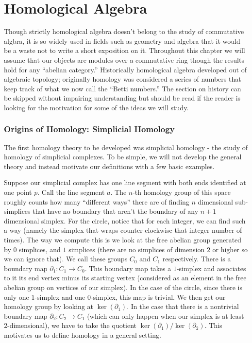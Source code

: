 \usepackage{amscd}
\chapter{Homological Algebra} 

Though strictly homological algebra doesn't
belong to the study of commutative algbra, it is so widely used in fields
such as geometry and algebra that it would be a waste not to write a short
exposition on it. Throughout this chapter we will assume that our objects are
modules over a commutative ring though the results hold for any ``abelian
category.'' Historically homological algebra developed out of algebraic
topology; originally homology was considered a series of numbers that keep
track of what we now call the ``Betti numbers.'' The section on history can
be skipped without impairing understanding but should be read if the reader
is looking for the motivation for some of the ideas we will study.

\subsection{Origins of Homology: Simplicial Homology}

The first homology theory
to be developed was simplicial homology - the study of homology of simplicial
complexes. To be simple, we will not develop the general theory and instead
motivate our definitions with a few basic examples.  

\begin{example} Suppose
our simplicial complex has one line segment with both ends identified at
one point $p$. Call the line segment $a$. The $n$-th homology group of this
space roughly counts how many ``different ways'' there are of finding $n$
dimensional sub-simplices that have no boundary that aren't the boundary of
any $n+1$ dimensional simplex. For the circle, notice that for each integer,
we can find such a way (namely the simplex that wraps counter clockwise that
integer number of times). The way we compute this is we look at the free abelian group generated by $0$ simplices, and $1$ simplices (there are no simplices of
dimension $2$ or higher so we can ignore that). We call these groups $C_0$ and
$C_1$ respectively. There is a boundary map $\partial_1: C_1\rightarrow C_0$.
This boundary map takes a $1$-simplex and associates to it its end vertex minus
its starting vertex (considered as an element in the free abelian group on
vertices of our simplex). In the case of the circle, since there is only one
$1$-simplex and one $0$-simplex, this map is trivial. We then get our homology
group by looking at $\ker(\partial_1)$. In the case that there is a nontrivial
boundary map $\partial_2: C_2\rightarrow C_1$ (which can only happen when our
simplex is at least $2$-dimensional), we have to take the quotient
$\ker(\partial_1)/\ker(\partial_2)$. This motivates us to define homology in a
general setting.
\end{example}

